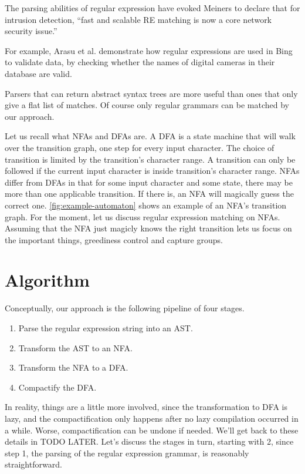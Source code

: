 \documentclass[english]{sigplanconf}
\theoremstyle{definition}
\newcommand{\ins}[1]{\textcolor{blue}{\uline{#1}}} %
\newcommand{\ins}[1]{#1} %
\renewcommand{\ins}[1]{#1} %
\begin{document}
The parsing abilities of regular expression have evoked Meiners to declare
that for intrusion detection, ``fast and scalable RE matching is
now a core network security issue.'' \cite{Mein10a}

For example, Arasu et al. \cite{Aras12a} demonstrate how regular
expressions are used in Bing to validate data, by checking whether
the names of digital cameras in their database are valid.

Parsers that can return abstract syntax trees are more useful than
ones that only give a flat list of matches. Of course only regular
grammars can be matched by our approach.

Let us recall what NFAs and DFAs are. A DFA is a state machine that
will walk over the transition graph, one step for every input
character. The choice of transition is limited by the transition's
character range. A transition can only be followed if the current
input character is inside transition's character range. NFAs differ
from DFAs in that for some input character and some state, there may
be more than \ins{one} applicable transition. If there is, an NFA will magically
guess the correct one. \autoref{fig:example-automaton} shows an example of
an NFA's transition graph. For the moment, let us discuss regular
expression matching on NFAs. Assuming that the NFA just magicly knows
the right transition lets us focus on the important things, greediness control
and capture groups.

\section{Algorithm}

Conceptually, our approach is the following pipeline of four stages.
\begin{enumerate}
  \item Parse the regular expression string into an AST.
  \item Transform the AST to an NFA.
  \item Transform the NFA to a DFA.
  \item Compactify the DFA.
\end{enumerate}

In reality, things are a little more involved, since the transformation
to DFA is lazy, and the compactification only happens after no lazy
compilation occurred in a while. Worse, compactification can be
undone if needed. We'll get back to these details in TODO LATER.
Let's discuss the stages in turn, starting with 2, since step 1,
the parsing of the regular expression grammar, is reasonably
straightforward.
\end{document}
